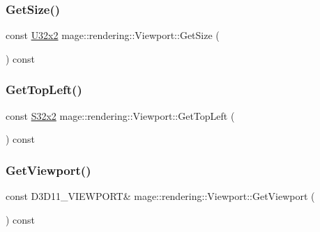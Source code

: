 \hypertarget{classmage_1_1rendering_1_1_viewport_a6e7381d208af8d079e93d8e04739eb36}{}\label{classmage_1_1rendering_1_1_viewport_a6e7381d208af8d079e93d8e04739eb36} 
\subsubsection{\texorpdfstring{Get\+Size()}{GetSize()}}
{\footnotesize\ttfamily const \hyperlink{namespacemage_a88e05bff0300120c013285d3dcad95c5}{U32x2} mage\+::rendering\+::\+Viewport\+::\+Get\+Size (\begin{DoxyParamCaption}{ }\end{DoxyParamCaption}) const\hspace{0.3cm}{\ttfamily [noexcept]}}

\hypertarget{classmage_1_1rendering_1_1_viewport_aa8155bd669f8ad083c4c20f8189cb293}{}\label{classmage_1_1rendering_1_1_viewport_aa8155bd669f8ad083c4c20f8189cb293} 
\subsubsection{\texorpdfstring{Get\+Top\+Left()}{GetTopLeft()}}
{\footnotesize\ttfamily const \hyperlink{namespacemage_a02de5a44f35ee9917e5788d63795fece}{S32x2} mage\+::rendering\+::\+Viewport\+::\+Get\+Top\+Left (\begin{DoxyParamCaption}{ }\end{DoxyParamCaption}) const\hspace{0.3cm}{\ttfamily [noexcept]}}

\hypertarget{classmage_1_1rendering_1_1_viewport_a9b931e5491d44459f598868eee59f1cc}{}\label{classmage_1_1rendering_1_1_viewport_a9b931e5491d44459f598868eee59f1cc} 
\subsubsection{\texorpdfstring{Get\+Viewport()}{GetViewport()}}
{\footnotesize\ttfamily const D3\+D11\+\_\+\+V\+I\+E\+W\+P\+O\+RT\& mage\+::rendering\+::\+Viewport\+::\+Get\+Viewport (\begin{DoxyParamCaption}{ }\end{DoxyParamCaption}) const\hspace{0.3cm}{\ttfamily [noexcept]}}

